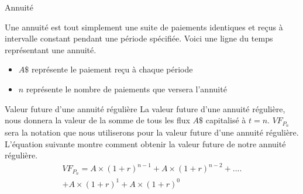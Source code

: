 \documentclass[11pt]{beamer}
\begin{document}
\begin{frame}{Annuité}

Une annuité est tout simplement une suite de paiements identiques et reçus à intervalle constant pendant une période spécifiée. Voici une ligne du temps représentant une annuité.
\vspace{1cm}

  \vspace{0.5cm}
\begin{itemize}
\item $A\$$ représente le paiement reçu à chaque période 
\item $n$ représente le nombre de paiements que versera l'annuité
\end{itemize}
\end{frame}


\begin{frame}{Valeur future d'une annuité régulière}
La valeur future d'une annuité régulière, nous donnera la valeur de la somme de tous les flux $A\$$ capitalisé à $t=n$. $VF_{P_n}$ sera la notation que nous utiliserons pour la valeur future d'une annuité régulière. L'équation suivante montre comment obtenir la valeur future de notre annuité régulière.  
\begin{align*}
VF_{P_n} = A \times (1+r)^{n-1}+A \times (1+r)^{n-2}+....\\+A \times (1+r)^{1}+A \times (1+r)^{0}
\end{align*}
\end{frame}
\end{document}
